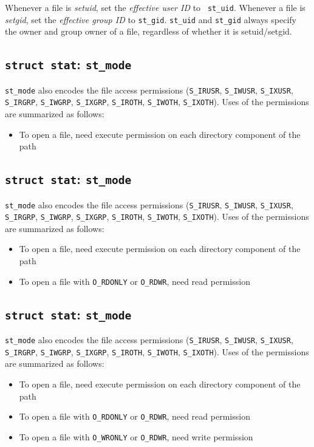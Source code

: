 \documentclass[xga]{xdvislides}
\begin{document}
Whenever a file is {\em setuid}, set the {\em effective user ID} to {\tt
st\_uid}. Whenever a file is {\em setgid}, set the {\em effective group ID} to
{\tt st\_gid}.  {\tt st\_uid} and {\tt st\_gid} always specify the owner and
group owner of a file, regardless of whether it is setuid/setgid.

\subsection{{\tt struct stat}: {\tt st\_mode}}
{\tt st\_mode} also encodes the file access permissions ({\tt S\_IRUSR},
{\tt S\_IWUSR}, {\tt S\_IXUSR}, {\tt S\_IRGRP}, {\tt S\_IWGRP}, {\tt S\_IXGRP},
{\tt S\_IROTH}, {\tt S\_IWOTH}, {\tt S\_IXOTH}).  Uses of the permissions are
summarized as follows:

\begin{itemize}
	\item To open a file, need execute permission on each directory component of the path
\end{itemize}

\subsection{{\tt struct stat}: {\tt st\_mode}}
{\tt st\_mode} also encodes the file access permissions ({\tt S\_IRUSR},
{\tt S\_IWUSR}, {\tt S\_IXUSR}, {\tt S\_IRGRP}, {\tt S\_IWGRP}, {\tt S\_IXGRP},
{\tt S\_IROTH}, {\tt S\_IWOTH}, {\tt S\_IXOTH}).  Uses of the permissions are
summarized as follows:

\begin{itemize}
	\item To open a file, need execute permission on each directory component of the path
	\item To open a file with {\tt O\_RDONLY} or {\tt O\_RDWR}, need read permission
\end{itemize}

\subsection{{\tt struct stat}: {\tt st\_mode}}
{\tt st\_mode} also encodes the file access permissions ({\tt S\_IRUSR},
{\tt S\_IWUSR}, {\tt S\_IXUSR}, {\tt S\_IRGRP}, {\tt S\_IWGRP}, {\tt S\_IXGRP},
{\tt S\_IROTH}, {\tt S\_IWOTH}, {\tt S\_IXOTH}).  Uses of the permissions are
summarized as follows:

\begin{itemize}
	\item To open a file, need execute permission on each directory component of the path
	\item To open a file with {\tt O\_RDONLY} or {\tt O\_RDWR}, need read permission
	\item To open a file with {\tt O\_WRONLY} or {\tt O\_RDWR}, need write permission
\end{itemize}
\end{document}
